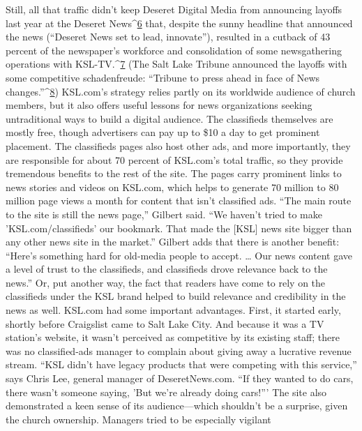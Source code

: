 Still, all that traffic didn't keep Deseret Digital Media from announcing layoffs
last year at the Deseret News^{\href{#endnotes-chapter-8}{6}} that, despite the sunny headline that announced
the news (``Deseret News set to lead, innovate''), resulted in a cutback
of 43 percent of the newspaper's workforce and consolidation of some newsgathering
operations with KSL-TV.^{\href{#endnotes-chapter-8}{7}} (The Salt Lake Tribune announced the
layoffs with some competitive schadenfreude: ``Tribune to press ahead in face
of News changes.''^{\href{#endnotes-chapter-8}{8}})
KSL.com's strategy relies partly on its worldwide audience of church members,
but it also offers useful lessons for news organizations seeking untraditional ways
to build a digital audience.
The classifieds themselves are mostly free, though advertisers can pay up to \$10
a day to get prominent placement. The classifieds pages also host other ads, and
more importantly, they are responsible for about 70 percent of KSL.com's total
traffic, so they provide tremendous benefits to the rest of the site. The pages carry
prominent links to news stories and videos on KSL.com, which helps to generate
70 million to 80 million page views a month for content that isn't classified
ads. ``The main route to the site is still the news page,'' Gilbert said. ``We haven't
tried to make 'KSL.com/classifieds' our bookmark. That made the [KSL] news
site bigger than any other news site in the market.''
Gilbert adds that there is another benefit: ``Here's something hard for old-media
people to accept. … Our news content gave a level of trust to the classifieds,
and classifieds drove relevance back to the news.'' Or, put another way, the fact
that readers have come to rely on the classifieds under the KSL brand helped to
build relevance and credibility in the news as well.
KSL.com had some important advantages. First, it started early, shortly before
Craigslist came to Salt Lake City. And because it was a TV station's website, it
wasn't perceived as competitive by its existing staff; there was no classified-ads
manager to complain about giving away a lucrative revenue stream. ``KSL didn't
have legacy products that were competing with this service,'' says Chris Lee,
general manager of DeseretNews.com. ``If they wanted to do cars, there wasn't
someone saying, 'But we're already doing cars!'''
The site also demonstrated a keen sense of its audience—which shouldn't be
a surprise, given the church ownership. Managers tried to be especially vigilant
